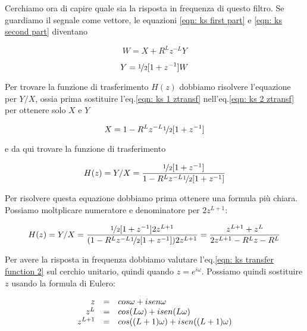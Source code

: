 Cerchiamo ora di capire quale sia la risposta in frequenza di questo filtro.
Se guardiamo il segnale come vettore, le equazioni \ref{eqn: ks first part} e
\ref{eqn: ks second part} diventano

\begin{equation}\label{eqn: ks 1 ztransf}
		W = X + R^{L} z^{-L} Y
\end{equation}

\begin{equation}\label{eqn: ks 2 ztransf}
		Y = \nicefrac{1}{2} [ 1 + z^{-1} ] W
\end{equation}

Per trovare la funzione di trasferimento $H(z)$ dobbiamo risolvere l'equazione
per $Y / X$, ossia prima sostituire l'eq.\ref{eqn: ks 1 ztransf}
nell'eq.\ref{eqn: ks 2 ztransf} per ottenere solo $X$ e $Y$

\begin{equation}\label{eqn: ks X}
				X = 1 - R^L z^{-L} \nicefrac{1}{2} [ 1 + z^{-1} ]  
\end{equation}

e da qui trovare la funzione di trasferimento

\begin{equation}\label{eqn: ks transfer function}
				H ( z ) = Y / X = \frac{\nicefrac{1}{2} [ 1 + z^{-1} ]}{1 - R^{L} z^{-L} \nicefrac{1}{2} [ 1 + z^{-1} ]}
\end{equation}

Per risolvere questa equazione dobbiamo prima ottenere una formula pi\`u
chiara. Possiamo moltplicare numeratore e denominatore per $2 z^{L + 1}$:

\begin{equation}\label{eqn: ks transfer function 2}
				H ( z ) = Y / X = \frac{\nicefrac{1}{2} [ 1 + z^{-1} ] 2 z^{L+1}}{(1 - R^{L} z^{-L} \nicefrac{1}{2} [ 1 + z^{-1} ]) 2 z^{L + 1}} = \frac{z^{L + 1} + z^{L}}{2 z^{L+1} - R^{L} z - R^{L}}
\end{equation}

Per avere la risposta in frequenza dobbiamo valutare l'eq.\ref{eqn: ks transfer function 2}
sul cerchio unitario, quindi quando $z = e^{i \omega}$. Possiamo quindi
sostituire $z$ usando la formula di Eulero:

\begin{equation}
	\begin{array}{r c l}
		z & = & cos \omega + i sen \omega\\
		z^{L} & = & cos ( L \omega ) + i sen ( L \omega )\\
		z^{L+1} & = & cos ( (L + 1) \omega ) + i sen ( (L + 1) \omega )\\
	\end{array}
\end{equation}

